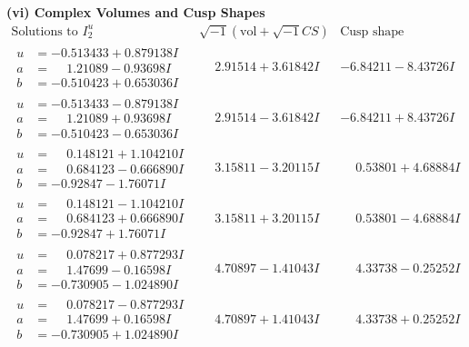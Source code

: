 \documentclass[1p]{elsarticle_modified}
\theoremstyle{definition}
\newcommand{\I}{\sqrt{-1}}
\begin{document}
\newpage\flushleft \textbf{(vi) Complex Volumes and Cusp Shapes}
$$\begin{array}{c|c|c}  
\text{Solutions to }I^u_{2}& \I (\text{vol} + \sqrt{-1}CS) & \text{Cusp shape}\\
 \hline 
\begin{aligned}
u &= -0.513433 + 0.879138 I \\
a &= \phantom{-}1.21089 - 0.93698 I \\
b &= -0.510423 + 0.653036 I\end{aligned}
 & \phantom{-}2.91514 + 3.61842 I & -6.84211 - 8.43726 I \\ \hline\begin{aligned}
u &= -0.513433 - 0.879138 I \\
a &= \phantom{-}1.21089 + 0.93698 I \\
b &= -0.510423 - 0.653036 I\end{aligned}
 & \phantom{-}2.91514 - 3.61842 I & -6.84211 + 8.43726 I \\ \hline\begin{aligned}
u &= \phantom{-}0.148121 + 1.104210 I \\
a &= \phantom{-}0.684123 - 0.666890 I \\
b &= -0.92847 - 1.76071 I\end{aligned}
 & \phantom{-}3.15811 - 3.20115 I & \phantom{-}0.53801 + 4.68884 I \\ \hline\begin{aligned}
u &= \phantom{-}0.148121 - 1.104210 I \\
a &= \phantom{-}0.684123 + 0.666890 I \\
b &= -0.92847 + 1.76071 I\end{aligned}
 & \phantom{-}3.15811 + 3.20115 I & \phantom{-}0.53801 - 4.68884 I \\ \hline\begin{aligned}
u &= \phantom{-}0.078217 + 0.877293 I \\
a &= \phantom{-}1.47699 - 0.16598 I \\
b &= -0.730905 - 1.024890 I\end{aligned}
 & \phantom{-}4.70897 - 1.41043 I & \phantom{-}4.33738 - 0.25252 I \\ \hline\begin{aligned}
u &= \phantom{-}0.078217 - 0.877293 I \\
a &= \phantom{-}1.47699 + 0.16598 I \\
b &= -0.730905 + 1.024890 I\end{aligned}
 & \phantom{-}4.70897 + 1.41043 I & \phantom{-}4.33738 + 0.25252 I \\ \hline\begin{aligned}

\end{aligned}
\end{array}$$
\end{document}
